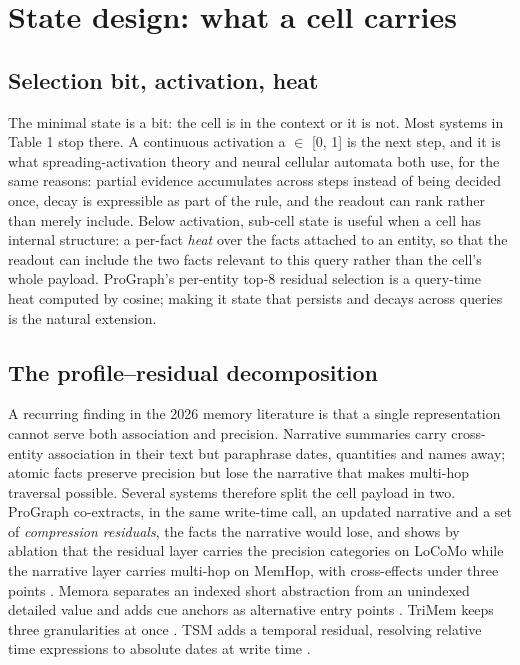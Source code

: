 \documentclass[11pt]{article}
\begin{document}
\section{State design: what a cell carries}

\subsection{Selection bit, activation, heat}

The minimal state is a bit: the cell is in the context or it is not. Most systems in Table 1 stop there. A continuous activation a $\in$ [0, 1] is the next step, and it is what spreading-activation theory \cite{collins1975,anderson1983} and neural cellular automata \cite{nca} both use, for the same reasons: partial evidence accumulates across steps instead of being decided once, decay is expressible as part of the rule, and the readout can rank rather than merely include. Below activation, sub-cell state is useful when a cell has internal structure: a per-fact \emph{heat} over the facts attached to an entity, so that the readout can include the two facts relevant to this query rather than the cell's whole payload. ProGraph's per-entity top-8 residual selection is a query-time heat computed by cosine; making it state that persists and decays across queries is the natural extension.

\subsection{The profile--residual decomposition}

A recurring finding in the 2026 memory literature is that a single representation cannot serve both association and precision. Narrative summaries carry cross-entity association in their text but paraphrase dates, quantities and names away; atomic facts preserve precision but lose the narrative that makes multi-hop traversal possible. Several systems therefore split the cell payload in two. ProGraph co-extracts, in the same write-time call, an updated narrative and a set of \emph{compression residuals}, the facts the narrative would lose, and shows by ablation that the residual layer carries the precision categories on LoCoMo while the narrative layer carries multi-hop on MemHop, with cross-effects under three points \cite{prograph}. Memora separates an indexed short abstraction from an unindexed detailed value and adds cue anchors as alternative entry points \cite{memora}. TriMem keeps three granularities at once \cite{trimem}. TSM adds a temporal residual, resolving relative time expressions to absolute dates at write time \cite{tsm}.
\end{document}
